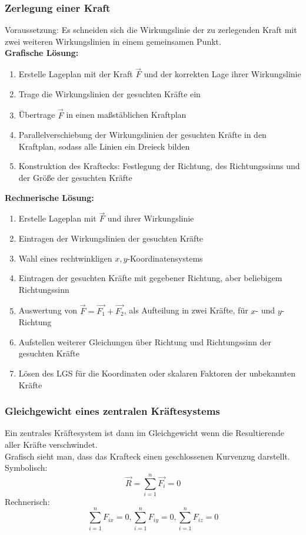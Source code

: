 \documentclass[a4paper,parskip=half*,DIV=7,fontsize=11pt]{scrartcl}
\begin{document}
	\subsubsection{Zerlegung einer Kraft}
	Voraussetzung: Es schneiden sich die Wirkungslinie der zu zerlegenden Kraft mit zwei weiteren Wirkungslinien in einem gemeinsamen Punkt.\\
	\textbf{Grafische Lösung:}
	\begin{enumerate}
		\item Erstelle Lageplan mit der Kraft $\overrightarrow{F}$ und der korrekten Lage ihrer Wirkungslinie
		\item Trage die Wirkungslinien der gesuchten Kräfte ein
		\item Übertrage $\overrightarrow{F}$ in einen maßstäblichen Kraftplan
		\item Parallelverschiebung der Wirkungslinien der gesuchten Kräfte in den Kraftplan, sodass alle Linien ein Dreieck bilden
		\item Konstruktion des Kraftecks: Festlegung der Richtung, des Richtungssinns und der Größe der gesuchten Kräfte
	\end{enumerate}
	\textbf{Rechnerische Lösung:}
	\begin{enumerate}
		\item Erstelle Lageplan mit $\overrightarrow{F}$ und ihrer Wirkungslinie
		\item Eintragen der Wirkungslinien der gesuchten Kräfte
		\item Wahl eines rechtwinkligen $x,y$-Koordinatensystems
		\item Eintragen der gesuchten Kräfte mit gegebener Richtung, aber beliebigem Richtungssinn
		\item Auswertung von $\overrightarrow{F}=\overrightarrow{F_1}+\overrightarrow{F_2}$, als Aufteilung in zwei Kräfte, für $x$- und $y$-Richtung
		\item Aufstellen weiterer Gleichungen über Richtung und Richtungssinn der gesuchten Kräfte
		\item Lösen des LGS für die Koordinaten oder skalaren Faktoren der unbekannten Kräfte
	\end{enumerate}
	
	\subsubsection{Gleichgewicht eines zentralen Kräftesystems}
	Ein zentrales Kräftesystem ist dann im Gleichgewicht wenn die Resultierende aller Kräfte verschwindet.\\
	Grafisch sieht man, dass das Krafteck einen geschlossenen Kurvenzug darstellt.\\
	Symbolisch: $$\overrightarrow{R}=\sum_{i=1}^n \overrightarrow{F_i}=0$$
	Rechnerisch: $$\sum_{i=1}^n F_{ix}=0,\sum_{i=1}^n F_{iy}=0,\sum_{i=1}^n F_{iz}=0$$
	
\end{document}
